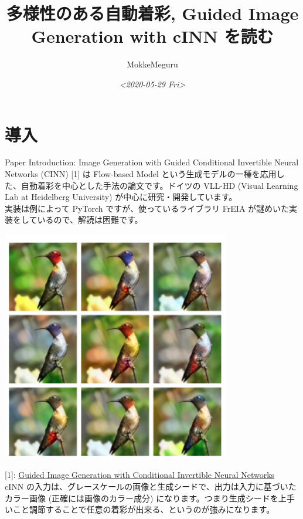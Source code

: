\documentclass[a4paper, dvipdfmx, 10pt]{article}
\author{MokkeMeguru}
\date{\textit{<2020-05-29 Fri>}}
\title{多様性のある自動着彩, Guided Image Generation with cINN を読む}
\begin{document}
\maketitle
\tableofcontents

\section{導入}
\label{sec:org6088550}
Paper Introduction:  Image Generation  with Guided Conditional Invertible Neural Networks (CINN) [1] は Flow-based Model という生成モデルの一種を応用した、自動着彩を中心とした手法の論文です。ドイツの VLL-HD (Visual Learning Lab at Heidelberg University) が中心に研究・開発しています。\\
実装は例によって PyTorch ですが、使っているライブラリ FrEIA が謎めいた実装をしているので、解読は困難です。\\

\begin{center}
\includegraphics[width=10cm]{./img/abst.png}
\end{center}

[1]: \href{https://github.com/VLL-HD/conditional\_invertible\_neural\_networks}{Guided Image Generation with Conditional Invertible Neural Networks}\\


cINN の入力は、グレースケールの画像と生成シードで、出力は入力に基づいたカラー画像 (正確には画像のカラー成分) になります。つまり生成シードを上手いこと調節することで任意の着彩が出来る、というのが強みになります。\\
\end{document}
